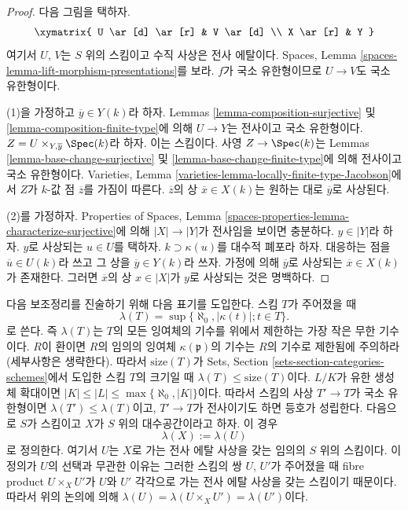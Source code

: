 \begin{proof}
다음 그림을 택하자.
$$
\xymatrix{
U \ar[d] \ar[r] & V \ar[d] \\
X \ar[r] & Y
}
$$
여기서 $U$, $V$는 $S$ 위의 스킴이고 수직 사상은 전사 에탈이다.
Spaces, Lemma \ref{spaces-lemma-lift-morphism-presentations}를 보라.
$f$가 국소 유한형이므로 $U \to V$도 국소 유한형이다.

\medskip\noindent
(1)을 가정하고 $\overline{y} \in Y(k)$라 하자.
Lemmas \ref{lemma-composition-surjective} 및
\ref{lemma-composition-finite-type}에 의해 $U \to Y$는
전사이고 국소 유한형이다.
$Z = U \times_{Y, \overline{y}} \Spec(k)$라 하자. 이는 스킴이다.
사영 $Z \to \Spec(k)$는 Lemmas
\ref{lemma-base-change-surjective} 및
\ref{lemma-base-change-finite-type}에 의해 전사이고 국소 유한형이다.
Varieties, Lemma \ref{varieties-lemma-locally-finite-type-Jacobson}에서
$Z$가 $k$-값 점 $\overline{z}$를 가짐이 따른다.
$\overline{z}$의 상 $\overline{x} \in X(k)$는 원하는 대로
$\overline{y}$로 사상된다.

\medskip\noindent
(2)를 가정하자. Properties of Spaces, Lemma
\ref{spaces-properties-lemma-characterize-surjective}에 의해
$|X| \to |Y|$가 전사임을 보이면 충분하다.
$y \in |Y|$라 하자. $y$로 사상되는 $u \in U$를 택하자.
$k \supset \kappa(u)$를 대수적 폐포라 하자.
대응하는 점을 $\overline{u} \in U(k)$라 쓰고 그 상을
$\overline{y} \in Y(k)$라 쓰자. 가정에 의해
$\overline{y}$로 사상되는 $\overline{x} \in X(k)$가 존재한다.
그러면 $\overline{x}$의 상 $x \in |X|$가 $y$로 사상되는 것은
명백하다.
\end{proof}

\noindent
다음 보조정리를 진술하기 위해 다음 표기를 도입한다. 스킴 $T$가
주어졌을 때
$$
\lambda(T) = \sup\{\aleph_0, |\kappa(t)| ; t \in T\}.
$$
로 쓴다. 즉 $\lambda(T)$는 $T$의 모든 잉여체의 기수를 위에서
제한하는 가장 작은 무한 기수이다. $R$이 환이면 $R$의 임의의
잉여체 $\kappa(\mathfrak p)$의 기수는 $R$의 기수로 제한됨에
주의하라(세부사항은 생략한다). 따라서
$\text{size}(T)$가 Sets, Section
\ref{sets-section-categories-schemes}에서 도입한 스킴 $T$의 크기일 때
$\lambda(T) \leq \text{size}(T)$이다.
$L/K$가 유한 생성 체 확대이면
$|K| \leq |L| \leq \max\{\aleph_0, |K|\}$이다.
따라서 스킴의 사상 $T' \to T$가 국소 유한형이면
$\lambda(T') \leq \lambda(T)$이고, $T' \to T$가 전사이기도 하면
등호가 성립한다. 다음으로 $S$가 스킴이고 $X$가 $S$ 위의
대수공간이라고 하자. 이 경우
$$
\lambda(X) := \lambda(U)
$$
로 정의한다. 여기서 $U$는 $X$로 가는 전사 에탈 사상을 갖는
임의의 $S$ 위의 스킴이다. 이 정의가 $U$의 선택과 무관한 이유는
그러한 스킴의 쌍 $U$, $U'$가 주어졌을 때 fibre product
$U \times_X U'$가 $U$와 $U'$ 각각으로 가는 전사 에탈 사상을
갖는 스킴이기 때문이다. 따라서 위의 논의에 의해
$\lambda(U) = \lambda(U \times_X U') = \lambda(U')$이다.

